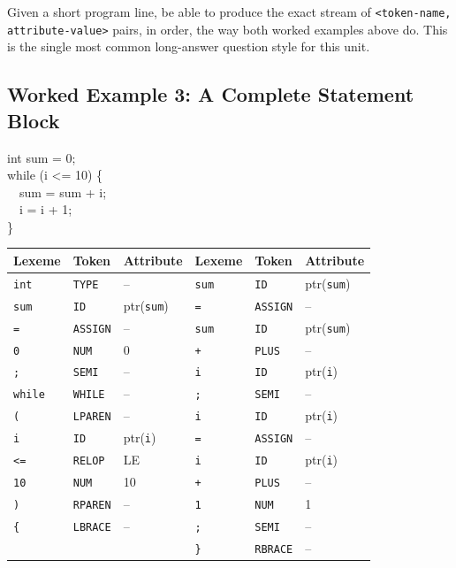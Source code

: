 \documentclass[full-course-notes.tex]{subfiles}
\begin{document}
\begin{examfocus}
Given a short program line, be able to produce the exact stream of
\texttt{<token-name, attribute-value>} pairs, in order, the way both worked examples above do.
This is the single most common long-answer question style for this unit.
\end{examfocus}

\subsection{Worked Example 3: A Complete Statement Block}
\label{sec:l3-worked-example-3}

\begin{center}
\begin{minipage}{0.5\textwidth}
\ttfamily
int sum = 0;\\
while (i <= 10) \{\\
\ \ sum = sum + i;\\
\ \ i = i + 1;\\
\}
\end{minipage}
\end{center}

\begin{center}
\renewcommand{\arraystretch}{1.15}
\footnotesize
\begin{tabularx}{\textwidth}{@{}l l X | l l X@{}}
\toprule
\textbf{Lexeme} & \textbf{Token} & \textbf{Attribute} & \textbf{Lexeme} & \textbf{Token} & \textbf{Attribute} \\
\midrule
\texttt{int} & \texttt{TYPE} & -- & \texttt{sum} & \texttt{ID} & ptr(\texttt{sum}) \\
\texttt{sum} & \texttt{ID} & ptr(\texttt{sum}) & \texttt{=} & \texttt{ASSIGN} & -- \\
\texttt{=} & \texttt{ASSIGN} & -- & \texttt{sum} & \texttt{ID} & ptr(\texttt{sum}) \\
\texttt{0} & \texttt{NUM} & 0 & \texttt{+} & \texttt{PLUS} & -- \\
\texttt{;} & \texttt{SEMI} & -- & \texttt{i} & \texttt{ID} & ptr(\texttt{i}) \\
\texttt{while} & \texttt{WHILE} & -- & \texttt{;} & \texttt{SEMI} & -- \\
\texttt{(} & \texttt{LPAREN} & -- & \texttt{i} & \texttt{ID} & ptr(\texttt{i}) \\
\texttt{i} & \texttt{ID} & ptr(\texttt{i}) & \texttt{=} & \texttt{ASSIGN} & -- \\
\texttt{<=} & \texttt{RELOP} & LE & \texttt{i} & \texttt{ID} & ptr(\texttt{i}) \\
\texttt{10} & \texttt{NUM} & 10 & \texttt{+} & \texttt{PLUS} & -- \\
\texttt{)} & \texttt{RPAREN} & -- & \texttt{1} & \texttt{NUM} & 1 \\
\texttt{\{} & \texttt{LBRACE} & -- & \texttt{;} & \texttt{SEMI} & -- \\
 & & & \texttt{\}} & \texttt{RBRACE} & -- \\
\bottomrule
\end{tabularx}
\end{center}
\end{document}
